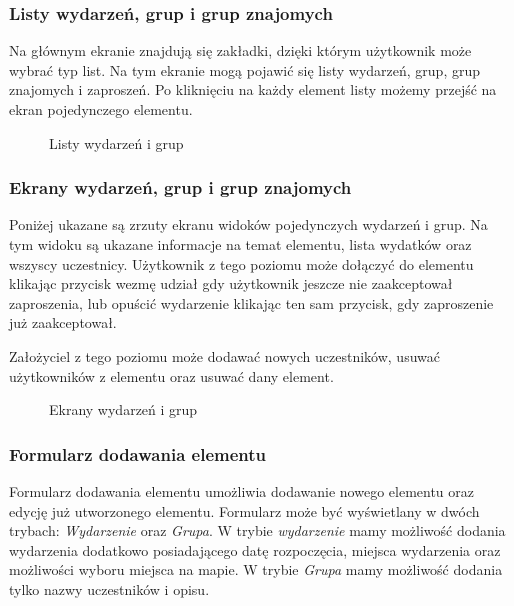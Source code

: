 \subsubsection{Listy wydarzeń, grup i grup znajomych}
Na głównym ekranie znajdują się zakładki, dzięki którym użytkownik może wybrać typ list. Na tym ekranie mogą pojawić się listy wydarzeń, grup, grup znajomych i zaproszeń. Po kliknięciu na każdy element listy możemy przejść na ekran pojedynczego elementu.

\begin{figure}[h!]%
    \centering
    \qquad
    \caption{Listy wydarzeń i grup}%
    \label{fig:example}%
\end{figure}

\newpage
\subsubsection{Ekrany wydarzeń, grup i grup znajomych}
Poniżej ukazane są zrzuty ekranu widoków pojedynczych wydarzeń i grup. Na tym widoku są ukazane informacje na temat elementu, lista wydatków oraz wszyscy uczestnicy. Użytkownik z tego poziomu może dołączyć do elementu klikając przycisk wezmę udział gdy użytkownik jeszcze nie zaakceptował zaproszenia, lub opuścić wydarzenie klikając ten sam przycisk, gdy zaproszenie już zaakceptował.

Założyciel z tego poziomu może dodawać nowych uczestników, usuwać użytkowników z elementu oraz usuwać dany element.

\begin{figure}[h!]%
    \centering
    \qquad
    \caption{Ekrany wydarzeń i grup}%
    \label{fig:example}%
\end{figure}

\newpage
\subsubsection{Formularz dodawania elementu}
Formularz dodawania elementu umożliwia dodawanie nowego elementu oraz edycję już utworzonego elementu. Formularz może być wyświetlany w dwóch trybach: \emph{Wydarzenie} oraz \emph{Grupa}. W trybie \emph{wydarzenie} mamy możliwość dodania wydarzenia dodatkowo posiadającego datę rozpoczęcia, miejsca wydarzenia oraz możliwości wyboru miejsca na mapie. W trybie \emph{Grupa} mamy możliwość dodania tylko nazwy uczestników i opisu.

